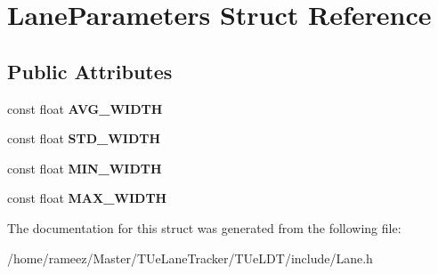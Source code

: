 \hypertarget{structLaneParameters}{\section{Lane\-Parameters Struct Reference}
\label{structLaneParameters}
}
\subsection*{Public Attributes}
\begin{DoxyCompactItemize}
\item 
\hypertarget{structLaneParameters_a4e57482888c8554c90892a291b1446a3}{const float {\bfseries A\-V\-G\-\_\-\-W\-I\-D\-T\-H}}\label{structLaneParameters_a4e57482888c8554c90892a291b1446a3}

\item 
\hypertarget{structLaneParameters_af035398d1945296f262ffb74036ad7f6}{const float {\bfseries S\-T\-D\-\_\-\-W\-I\-D\-T\-H}}\label{structLaneParameters_af035398d1945296f262ffb74036ad7f6}

\item 
\hypertarget{structLaneParameters_a20835672f0de66ee93c247dececcf717}{const float {\bfseries M\-I\-N\-\_\-\-W\-I\-D\-T\-H}}\label{structLaneParameters_a20835672f0de66ee93c247dececcf717}

\item 
\hypertarget{structLaneParameters_a21e893076edf22dc4a71e265761a928f}{const float {\bfseries M\-A\-X\-\_\-\-W\-I\-D\-T\-H}}\label{structLaneParameters_a21e893076edf22dc4a71e265761a928f}

\end{DoxyCompactItemize}


The documentation for this struct was generated from the following file\-:\begin{DoxyCompactItemize}
\item 
/home/rameez/\-Master/\-T\-Ue\-Lane\-Tracker/\-T\-Ue\-L\-D\-T/include/Lane.\-h\end{DoxyCompactItemize}
